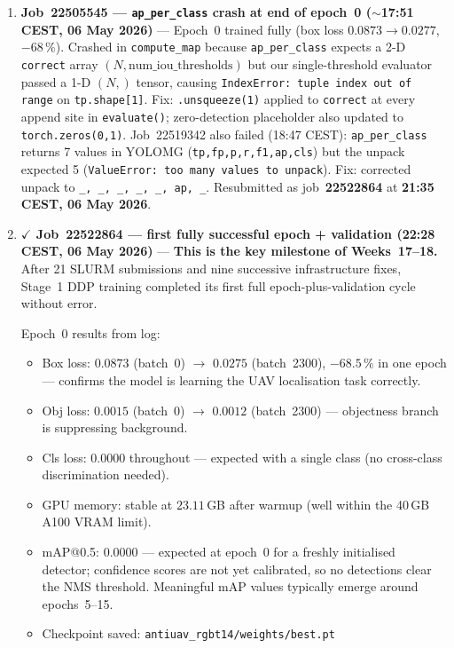 \begin{enumerate}
    \item \textbf{Job~22505545 — \texttt{ap\_per\_class} crash at end of epoch~0
          ($\sim$17:51 CEST, 06 May 2026)} —
          Epoch~0 trained fully (box loss $0.0873\!\to\!0.0277$, $-68\,\%$).
          Crashed in \texttt{compute\_map} because \texttt{ap\_per\_class}
          expects a 2-D \texttt{correct} array $(N, \text{num\_iou\_thresholds})$
          but our single-threshold evaluator passed a 1-D $(N,)$ tensor,
          causing \texttt{IndexError: tuple index out of range} on
          \texttt{tp.shape[1]}. Fix: \texttt{.unsqueeze(1)} applied to
          \texttt{correct} at every append site in \texttt{evaluate()};
          zero-detection placeholder also updated to \texttt{torch.zeros(0,1)}.
          Job~22519342 also failed (18:47 CEST): \texttt{ap\_per\_class}
          returns 7 values in YOLOMG (\texttt{tp,fp,p,r,f1,ap,cls}) but the
          unpack expected 5 (\texttt{ValueError: too many values to unpack}).
          Fix: corrected unpack to \texttt{\_, \_, \_, \_, \_, ap, \_}.
          Resubmitted as job~\textbf{22522864} at \textbf{21:35 CEST, 06 May 2026}.

    \item \textbf{\boldmath$\checkmark$ Job~22522864 — first fully successful
          epoch + validation (22:28 CEST, 06 May 2026)} —
          \textbf{This is the key milestone of Weeks~17--18.}
          After 21 SLURM submissions and nine successive infrastructure
          fixes, Stage~1 DDP training completed its first full
          epoch-plus-validation cycle without error.

          Epoch~0 results from log:
          \begin{itemize}
              \item Box loss: $0.0873$ (batch~0) $\to$ $0.0275$ (batch~2300),
                    $-68.5\,\%$ in one epoch — confirms the model is learning
                    the UAV localisation task correctly.
              \item Obj loss: $0.0015$ (batch~0) $\to$ $0.0012$ (batch~2300)
                    — objectness branch is suppressing background.
              \item Cls loss: $0.0000$ throughout — expected with a single
                    class (no cross-class discrimination needed).
              \item GPU memory: stable at $23.11$\,GB after warmup
                    (well within the 40\,GB A100 VRAM limit).
              \item mAP@0.5: $0.0000$ — expected at epoch~0 for a freshly
                    initialised detector; confidence scores are not yet
                    calibrated, so no detections clear the NMS threshold.
                    Meaningful mAP values typically emerge around
                    epochs~5--15.
              \item Checkpoint saved:
                    \texttt{antiuav\_rgbt14/weights/best.pt}
          \end{itemize}


\end{enumerate}
